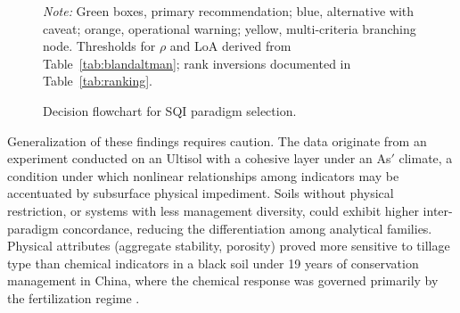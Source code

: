 \documentclass[pdflatex,sn-basic]{sn-jnl}%
\begin{document}
\begin{figure}[!htb]
{%
}%
\caption{Decision flowchart for SQI paradigm selection.}\label{fig:flowchart}
\smallskip\noindent\textit{Note:} Green boxes, primary recommendation; blue, alternative with caveat; orange, operational warning; yellow, multi-criteria branching node. Thresholds for $\rho$ and LoA derived from Table~\ref{tab:blandaltman}; rank inversions documented in Table~\ref{tab:ranking}.
\end{figure}

Generalization of these findings requires caution. The data originate from an experiment conducted on an Ultisol with a cohesive layer \citep{LimaNeto2010} under an As$'$ climate, a condition under which nonlinear relationships among indicators may be accentuated by subsurface physical impediment. Soils without physical restriction, or systems with less management diversity, could exhibit higher inter-paradigm concordance, reducing the differentiation among analytical families. Physical attributes (aggregate stability, porosity) proved more sensitive to tillage type than chemical indicators in a black soil under 19 years of conservation management in China, where the chemical response was governed primarily by the fertilization regime \citep{Zhao2022}.
\end{document}
